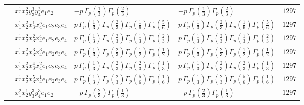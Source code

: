 \documentclass[11pt]{article}
\begin{document}
\begin{table}[ht]
{\begin{tabular}{@{}lllll@{}}
 & $x_{1}^{1} x_{2}^{2} y_{3}^{3} y_{4}^{3} e_{1} e_{2}$ & $- p \, \Gamma_p \left( \frac{1}{3} \right) \Gamma_p \left( \frac{2}{3} \right)$ & $- p \, \Gamma_p \left( \frac{1}{3} \right) \Gamma_p \left( \frac{2}{3} \right)$ & $1297$ \\
 & $x_{1}^{1} x_{2}^{2} x_{3}^{1} x_{4}^{5}  e_{1} e_{2} e_{3} e_{4}$ & $p \, \Gamma_p \left( \frac{1}{3} \right) \Gamma_p \left( \frac{2}{3} \right) \Gamma_p \left( \frac{1}{6} \right) \Gamma_p \left( \frac{5}{6} \right)$ & $p \, \Gamma_p \left( \frac{1}{3} \right) \Gamma_p \left( \frac{2}{3} \right) \Gamma_p \left( \frac{1}{6} \right) \Gamma_p \left( \frac{5}{6} \right)$ & $1297$ \\
 & $x_{1}^{1} x_{2}^{2} x_{3}^{2} x_{4}^{4}  e_{1} e_{2} e_{3} e_{4}$ & $p \, \Gamma_p \left( \frac{1}{3} \right) \Gamma_p \left( \frac{2}{3} \right) \Gamma_p \left( \frac{1}{3} \right) \Gamma_p \left( \frac{2}{3} \right)$ & $p \, \Gamma_p \left( \frac{1}{3} \right) \Gamma_p \left( \frac{2}{3} \right) \Gamma_p \left( \frac{1}{3} \right) \Gamma_p \left( \frac{2}{3} \right)$ & $1297$ \\
 & $x_{1}^{1} x_{2}^{2} x_{3}^{3} x_{4}^{3}  e_{1} e_{2} e_{3} e_{4}$ & $p \, \Gamma_p \left( \frac{1}{3} \right) \Gamma_p \left( \frac{2}{3} \right) \Gamma_p \left( \frac{1}{2} \right) \Gamma_p \left( \frac{1}{2} \right)$ & $p \, \Gamma_p \left( \frac{1}{3} \right) \Gamma_p \left( \frac{2}{3} \right) \Gamma_p \left( \frac{1}{2} \right) \Gamma_p \left( \frac{1}{2} \right)$ & $1297$ \\
 & $x_{1}^{1} x_{2}^{2} x_{3}^{4} x_{4}^{2}  e_{1} e_{2} e_{3} e_{4}$ & $p \, \Gamma_p \left( \frac{1}{3} \right) \Gamma_p \left( \frac{2}{3} \right) \Gamma_p \left( \frac{2}{3} \right) \Gamma_p \left( \frac{1}{3} \right)$ & $p \, \Gamma_p \left( \frac{1}{3} \right) \Gamma_p \left( \frac{2}{3} \right) \Gamma_p \left( \frac{2}{3} \right) \Gamma_p \left( \frac{1}{3} \right)$ & $1297$ \\
 & $x_{1}^{1} x_{2}^{2} x_{3}^{5} x_{4}^{1}  e_{1} e_{2} e_{3} e_{4}$ & $p \, \Gamma_p \left( \frac{1}{3} \right) \Gamma_p \left( \frac{2}{3} \right) \Gamma_p \left( \frac{5}{6} \right) \Gamma_p \left( \frac{1}{6} \right)$ & $p \, \Gamma_p \left( \frac{1}{3} \right) \Gamma_p \left( \frac{2}{3} \right) \Gamma_p \left( \frac{5}{6} \right) \Gamma_p \left( \frac{1}{6} \right)$ & $1297$ \\
 & $x_{1}^{2} x_{2}^{1} y_{3}^{3} y_{4}^{3} e_{1} e_{2}$ & $- p \, \Gamma_p \left( \frac{2}{3} \right) \Gamma_p \left( \frac{1}{3} \right)$ & $- p \, \Gamma_p \left( \frac{2}{3} \right) \Gamma_p \left( \frac{1}{3} \right)$ & $1297$ \\

\end{tabular}}
\end{table}
\end{document}
